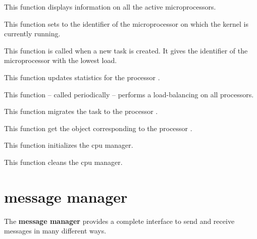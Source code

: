 	 {
	   This function displays information on all the active
	   microprocessors.
	 }

	 {
	   This function sets  to the identifier of the
	   microprocessor on which the kernel is currently running.
	 }

	 {
	   This function is called when a new task is created. It gives
	   the identifier of the microprocessor with the lowest load.

	 }

	 {
	   This function updates statistics for the processor .

	 }

	 {
	   This function -- called periodically -- performs a
	   load-balancing on all processors.

	 }

	 {
	   This function migrates the task  to the
	   processor .
	 }

	 {
	   This function get the object corresponding to the processor
	   .
	 }

	 {
	   This function initializes the cpu manager.
	 }

	 {
	   This function cleans the cpu manager.
	 }


%
%

\section{message manager}

The \textbf{message manager} provides a complete interface to send and
receive messages in many different ways.

